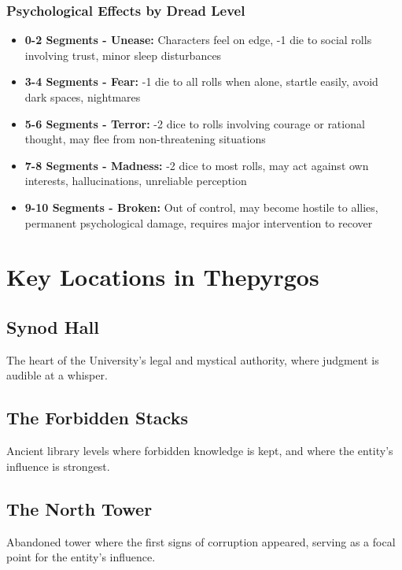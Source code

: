 \documentclass[11pt]{article}
\begin{document}
\subsubsection{Psychological Effects by Dread Level}

\begin{itemize}
\item \textbf{0-2 Segments - Unease:} Characters feel on edge, -1 die to social rolls involving trust, minor sleep disturbances
\item \textbf{3-4 Segments - Fear:} -1 die to all rolls when alone, startle easily, avoid dark spaces, nightmares
\item \textbf{5-6 Segments - Terror:} -2 dice to rolls involving courage or rational thought, may flee from non-threatening situations
\item \textbf{7-8 Segments - Madness:} -2 dice to most rolls, may act against own interests, hallucinations, unreliable perception
\item \textbf{9-10 Segments - Broken:} Out of control, may become hostile to allies, permanent psychological damage, requires major intervention to recover
\end{itemize}

\section{Key Locations in Thepyrgos}

\subsection{Synod Hall}

The heart of the University's legal and mystical authority, where judgment is audible at a whisper.

\subsection{The Forbidden Stacks}

Ancient library levels where forbidden knowledge is kept, and where the entity's influence is strongest.

\subsection{The North Tower}

Abandoned tower where the first signs of corruption appeared, serving as a focal point for the entity's influence.
\end{document}
